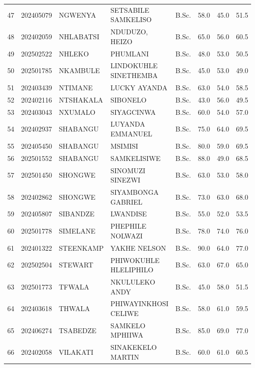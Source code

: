 \documentclass[12pt]{article}
\begin{document}
\begin{longtable}{@{}llllllll@{}}
47 & 202405079 & NGWENYA & SETSABILE SAMKELISO & B.Sc. & 58.0 & 45.0 & 51.5 \\
48 & 202402059 & NHLABATSI & NDUDUZO, HEIZO & B.Sc. & 65.0 & 56.0 & 60.5 \\
49 & 202502522 & NHLEKO & PHUMLANI & B.Sc. & 48.0 & 53.0 & 50.5 \\
50 & 202501785 & NKAMBULE & LINDOKUHLE SINETHEMBA & B.Sc. & 45.0 & 53.0 & 49.0 \\
51 & 202403439 & NTIMANE & LUCKY AYANDA & B.Sc. & 63.0 & 54.0 & 58.5 \\
52 & 202402116 & NTSHAKALA & SIBONELO & B.Sc. & 43.0 & 56.0 & 49.5 \\
53 & 202403043 & NXUMALO & SIYAGCINWA & B.Sc. & 60.0 & 54.0 & 57.0 \\
54 & 202402937 & SHABANGU & LUYANDA EMMANUEL & B.Sc. & 75.0 & 64.0 & 69.5 \\
55 & 202405450 & SHABANGU & MSIMISI & B.Sc. & 80.0 & 59.0 & 69.5 \\
56 & 202501552 & SHABANGU & SAMKELISIWE & B.Sc. & 88.0 & 49.0 & 68.5 \\
57 & 202501450 & SHONGWE & SINOMUZI SINEZWI & B.Sc. & 63.0 & 53.0 & 58.0 \\
58 & 202402862 & SHONGWE & SIYAMBONGA GABRIEL & B.Sc. & 73.0 & 63.0 & 68.0 \\
59 & 202405807 & SIBANDZE & LWANDISE & B.Sc. & 55.0 & 52.0 & 53.5 \\
60 & 202501778 & SIMELANE & PHEPHILE NOLWAZI & B.Sc. & 78.0 & 74.0 & 76.0 \\
61 & 202401322 & STEENKAMP & YAKHE NELSON & B.Sc. & 90.0 & 64.0 & 77.0 \\
62 & 202502504 & STEWART & PHIWOKUHLE HLELIPHILO & B.Sc. & 63.0 & 67.0 & 65.0 \\
63 & 202501773 & TFWALA & NKULULEKO ANDY & B.Sc. & 45.0 & 58.0 & 51.5 \\
64 & 202403618 & THWALA & PHIWAYINKHOSI CELIWE & B.Sc. & 58.0 & 61.0 & 59.5 \\
65 & 202406274 & TSABEDZE & SAMKELO MPHIIWA & B.Sc. & 85.0 & 69.0 & 77.0 \\
66 & 202402058 & VILAKATI & SINAKEKELO MARTIN & B.Sc. & 60.0 & 61.0 & 60.5 \\


\end{longtable}
\end{document}
